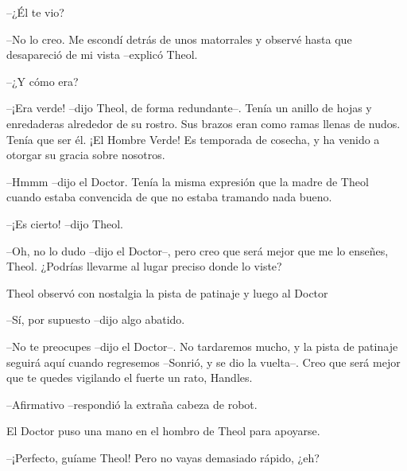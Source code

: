 --¿Él te vio?



--No lo creo. Me escondí detrás de unos matorrales y observé hasta que desapareció de mi vista --explicó Theol. 



--¿Y cómo era?



--¡Era verde! --dijo Theol, de forma redundante--. Tenía un anillo de hojas y enredaderas alrededor de su rostro. Sus brazos eran como ramas llenas de nudos. Tenía que ser él. ¡El Hombre Verde! Es temporada de cosecha, y ha venido a otorgar su gracia sobre nosotros. 



--Hmmm --dijo el Doctor. Tenía la misma expresión que la madre de Theol cuando estaba convencida de que no estaba tramando nada bueno. 



--¡Es cierto! --dijo Theol. 



--Oh, no lo dudo --dijo el Doctor--, pero creo que será mejor que me lo enseñes, Theol. ¿Podrías llevarme al lugar preciso donde lo viste?



Theol observó con nostalgia la pista de patinaje y luego al Doctor

--Sí, por supuesto --dijo algo abatido. 



--No te preocupes --dijo el Doctor--. No tardaremos mucho, y la pista de patinaje seguirá aquí cuando regresemos --Sonrió, y se dio la vuelta--. Creo que será mejor que te quedes vigilando el fuerte un rato, Handles. 



--Afirmativo --respondió la extraña cabeza de robot. 



El Doctor puso una mano en el hombro de Theol para apoyarse. 

--¡Perfecto, guíame Theol! Pero no vayas demasiado rápido, ¿eh?

